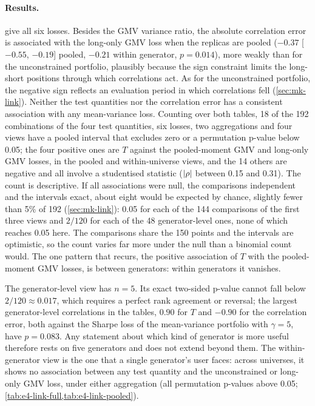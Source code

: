 \paragraph{Results.}
 give all six losses. Besides the GMV variance ratio,
the absolute correlation error is associated with the long-only GMV loss when the replicas are
pooled ($-0.37$ [$-0.55$, $-0.19$] pooled, $-0.21$ within generator, $p=0.014$), more weakly than
for the unconstrained portfolio, plausibly because the sign constraint limits the long-short
positions through which correlations act. As for the unconstrained portfolio, the negative sign
reflects an evaluation period in which correlations fell (\cref{sec:mk-link}). Neither the test
quantities nor the correlation error has a consistent association with any mean-variance loss.
Counting over both tables, 18 of the 192 combinations of the four test quantities, six losses,
two aggregations and four views have a pooled interval that excludes zero or a permutation
p-value below 0.05; the four positive ones are $T$ against the pooled-moment GMV and long-only GMV
losses, in the pooled and within-universe views, and the 14 others are negative and all involve
a studentised statistic ($\lvert\rho\rvert$ between 0.15 and 0.31). The count is descriptive. If all
associations were null, the comparisons independent and the intervals exact, about eight would
be expected by chance, slightly fewer than 5\% of 192 (\cref{sec:mk-link}): 0.05 for each of the
144 comparisons of the first three views and $2/120$ for each of the 48 generator-level ones,
none of which reaches 0.05 here. The comparisons share the 150 points and the intervals are
optimistic, so the count varies far more under the null than a binomial count would. The one
pattern that recurs, the positive association of $T$ with the pooled-moment GMV losses, is
between generators: within generators it vanishes.

The generator-level view has $n=5$. Its exact two-sided p-value cannot fall below
$2/120\approx0.017$, which requires a perfect rank agreement or reversal; the largest
generator-level correlations in the tables, $0.90$ for $T$ and $-0.90$ for the correlation error,
both against the Sharpe loss of the mean-variance portfolio with $\gamma=5$, have $p=0.083$. Any
statement about which kind of generator is more useful therefore rests on five generators and
does not extend beyond them. The within-generator view is the one that a single generator's user
faces: across universes, it shows no association between any test quantity and the
unconstrained or long-only GMV loss, under either aggregation (all permutation p-values above
0.05; \cref{tab:e4-link-full,tab:e4-link-pooled}).

